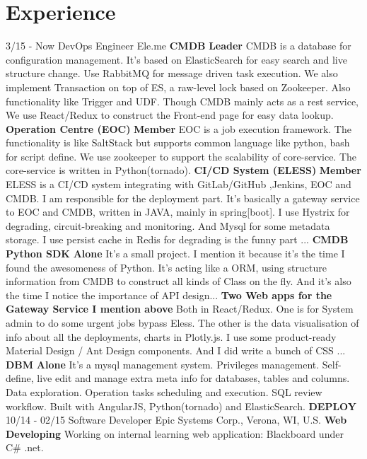 \documentclass[]{friggeri-cv}
\begin{document}
\section{Experience}
\begin{entrylist}
  \entry
  	{3/15 - Now}
  	{DevOps Engineer}
  	{Ele.me}
  	{\textbf{CMDB} \textbf{Leader} CMDB is a database for configuration management. It's based on ElasticSearch for easy search and live structure change. Use RabbitMQ for message driven task execution. We also implement Transaction on top of ES, a raw-level lock based on Zookeeper. Also functionality like Trigger and UDF. Though CMDB mainly acts as a rest service, We use React/Redux to construct the Front-end page for easy data lookup. }
  	{\textbf{Operation Centre (EOC)} \textbf{Member} EOC is a job execution framework. The functionality is like SaltStack but supports common language like python, bash for script define. We use zookeeper to support the scalability of core-service. The core-service is written in Python(tornado). }
  	{\textbf{CI/CD System (ELESS)} \textbf{Member} ELESS is a CI/CD system integrating with GitLab/GitHub ,Jenkins, EOC and CMDB. I am responsible for the deployment part. It's basically a gateway service to EOC and CMDB, written in JAVA, mainly in spring[boot]. I use Hystrix for degrading, circuit-breaking and monitoring. And Mysql for some metadata storage. I use persist cache in Redis for degrading is the funny part ... }
  	{\textbf{CMDB Python SDK} \textbf{Alone} It's a small project. I mention it because it's the time I found the awesomeness of Python. It's acting like a ORM, using structure information from CMDB to construct all kinds of Class on the fly.  And it's also the time I notice the importance of API design... }
  	{\textbf{Two Web apps for the Gateway Service I mention above} Both in React/Redux. One is for System admin to do some urgent jobs bypass Eless. The other is the data visualisation of info about all the deployments, charts in Plotly.js. I use some product-ready Material Design / Ant Design components. And I did write a bunch of CSS ... }
  	{\textbf{DBM} \textbf{Alone} It's a mysql management system. Privileges management. Self-define, live edit and manage extra meta info for databases, tables and columns.  Data exploration. Operation tasks scheduling and execution. SQL review workflow. Built with AngularJS, Python(tornado) and ElasticSearch. }
  	{\textbf{DEPLOY}}
  \entry
    {10/14 - 02/15}
    {Software Developer}
    {Epic Systems Corp., Verona, WI, U.S.}
    {\textbf{Web Developing} Working on internal learning web application: Blackboard under C\# .net. \\}
\end{entrylist}
~
~
~
\end{document}
